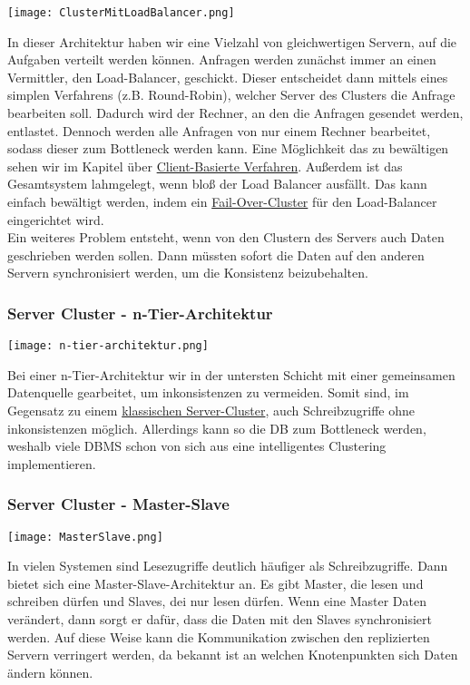 \texttt{[image: ClusterMitLoadBalancer.png]}

In dieser Architektur haben wir eine Vielzahl von gleichwertigen Servern, auf die Aufgaben verteilt werden können. Anfragen werden zunächst immer an einen Vermittler, den Load-Balancer, geschickt. Dieser entscheidet dann mittels eines simplen Verfahrens (z.B. Round-Robin), welcher Server des Clusters die Anfrage bearbeiten soll. Dadurch wird der Rechner, an den die Anfragen gesendet werden, entlastet. Dennoch werden alle Anfragen von nur einem Rechner bearbeitet, sodass dieser zum Bottleneck werden kann. Eine Möglichkeit das zu bewältigen sehen wir im Kapitel über \hyperref[client-based]{Client-Basierte Verfahren}. Außerdem ist das Gesamtsystem lahmgelegt, wenn bloß der Load Balancer ausfällt. Das kann einfach bewältigt werden, indem ein \hyperref[sec:fail-over-cluster]{Fail-Over-Cluster} für den Load-Balancer eingerichtet wird.\\
Ein weiteres Problem entsteht, wenn von den Clustern des Servers auch Daten geschrieben werden sollen. Dann müssten sofort die Daten auf den anderen Servern synchronisiert werden, um die Konsistenz beizubehalten.

\subsubsection{Server Cluster - n-Tier-Architektur}

\texttt{[image: n-tier-architektur.png]}

Bei einer n-Tier-Architektur wir in der untersten Schicht mit einer gemeinsamen Datenquelle gearbeitet, um inkonsistenzen zu vermeiden. Somit sind, im Gegensatz zu einem \hyperref[sec:classic-server-cluster]{klassischen Server-Cluster}, auch Schreibzugriffe ohne inkonsistenzen möglich. Allerdings kann so die DB zum Bottleneck werden, weshalb viele DBMS schon von sich aus eine intelligentes Clustering implementieren.

\subsubsection{Server Cluster - Master-Slave}
\label{sec:master-slave}

\texttt{[image: MasterSlave.png]}

In vielen Systemen sind Lesezugriffe deutlich häufiger als Schreibzugriffe. Dann bietet sich eine Master-Slave-Architektur an. Es gibt Master, die lesen und schreiben dürfen und Slaves, dei nur lesen dürfen. Wenn eine Master Daten verändert, dann sorgt er dafür, dass die Daten mit den Slaves synchronisiert werden. Auf diese Weise kann die Kommunikation zwischen den replizierten Servern verringert werden, da bekannt ist an welchen Knotenpunkten sich Daten ändern können.

